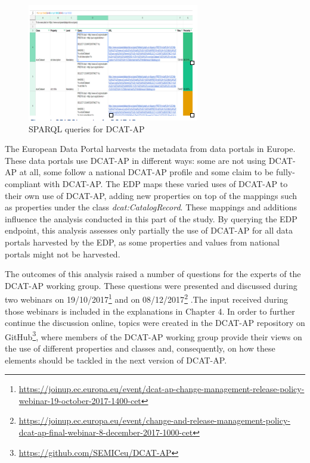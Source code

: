 \documentclass[<options>]{elsarticle}
\begin{document}
\begin{figure}[!h]
\includegraphics{replace1.png}
\caption{SPARQL queries for DCAT-AP}
\end{figure}

The European Data Portal harvests the metadata from data portals in Europe. These data portals use DCAT-AP in different ways: some are not using DCAT-AP at all, some follow a national DCAT-AP profile and some claim to be fully-compliant with DCAT-AP. The EDP maps these varied uses of DCAT-AP to their own use of DCAT-AP, adding new properties on top of the mappings such as properties under the class \textit{dcat:CatalogRecord}. These mappings and additions influence the analysis conducted in this part of the study. By querying the EDP endpoint, this analysis assesses only partially the use of DCAT-AP for all data portals harvested by the EDP, as some properties and values from national portals might not be harvested.

The outcomes of this analysis raised a number of questions for the experts of the DCAT-AP working group. These questions were presented and discussed during two webinars on 19/10/2017\footnote{\href{ https://joinup.ec.europa.eu/event/dcat-ap-change-management-release-policy-webinar-19-october-2017-1400-cet}{ https://joinup.ec.europa.eu/event/dcat-ap-change-management-release-policy-webinar-19-october-2017-1400-cet}} and on 08/12/2017\footnote{\href{ https://joinup.ec.europa.eu/event/change-and-release-management-policy-dcat-ap-final-webinar-8-december-2017-1000-cet}{ https://joinup.ec.europa.eu/event/change-and-release-management-policy-dcat-ap-final-webinar-8-december-2017-1000-cet}} .The input received during those webinars is included in the explanations in Chapter 4. In order to further continue the discussion online, topics were created in the DCAT-AP repository on GitHub\footnote{\href{  https://github.com/SEMICeu/DCAT-AP}{  https://github.com/SEMICeu/DCAT-AP}}, where members of the DCAT-AP working group provide their views on the use of different properties and classes and, consequently, on how these elements should be tackled in the next version of DCAT-AP.
\end{document}
